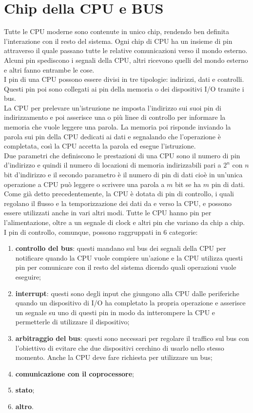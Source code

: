 \documentclass[12pt]{report}
\begin{document}
			\section{Chip della CPU e BUS}
			Tutte le CPU moderne sono contenute in unico chip, rendendo ben definita l'interazione con il resto del sistema. Ogni chip di CPU ha un insieme di pin attraverso il quale passano tutte le relative comunicazioni verso il mondo esterno. Alcuni pin spediscono i segnali della CPU, altri ricevono quelli del mondo esterno e altri fanno entrambe le cose. \\
			I pin di una CPU possono essere divisi in tre tipologie: indirizzi, dati e controlli. Questi pin poi sono collegati ai pin della memoria o dei dispositivi I/O tramite i bus. \\
			La CPU per prelevare un'istruzione ne imposta l'indirizzo sui suoi pin di indirizzamento e poi asserisce una o più linee di controllo per informare la memoria che vuole leggere una parola. La memoria poi risponde inviando la parola sui pin della CPU dedicati ai dati e segnalando che l'operazione è completata, così la CPU accetta la parola ed esegue l'istruzione. \\
			Due parametri che definiscono le prestazioni di una CPU sono il numero di pin d'indirizzo e quindi il numero di locazioni di memoria indirizzabili pari a $2^n$ con $n$ bit d'indirizzo e il secondo parametro è il numero di pin di dati cioè in un'unica operazione a CPU può leggere o scrivere una parola a $m$ bit se ha $m$ pin di dati. \\
			Come già detto precedentemente, la CPU è dotata di pin di controllo, i quali regolano il flusso e la temporizzazione dei dati da e verso la CPU, e possono essere utilizzati anche in vari altri modi. Tutte le CPU hanno pin per l'alimentazione, oltre a un segnale di clock e altri pin che variano da chip a chip. \\
			I pin di controllo, comunque, possono raggruppati in 6 categorie:
			\begin{enumerate}
				\item \textbf{controllo del bus}: questi mandano sul bus dei segnali della CPU per notificare quando la CPU vuole compiere un'azione e la CPU utilizza questi pin per comunicare con il resto del sistema dicendo quali operazioni vuole eseguire;
				\item \textbf{interrupt}: questi sono degli input che giungono alla CPU dalle periferiche quando un dispositivo di I/O ha completato la propria operazione e asserisce un segnale su uno di questi pin in modo da intterompere la CPU e permetterle di utilizzare il dispositivo;
				\item \textbf{arbitraggio del bus}: questi sono necessari per regolare il traffico sul bus con l'obiettivo di evitare che due dispositivi cerchino di usarlo nello stesso momento. Anche la CPU deve fare richiesta per utilizzare un bus;
				\item \textbf{comunicazione con il coprocessore};
				\item \textbf{stato};
				\item \textbf{altro}.
			\end{enumerate}
\end{document}
